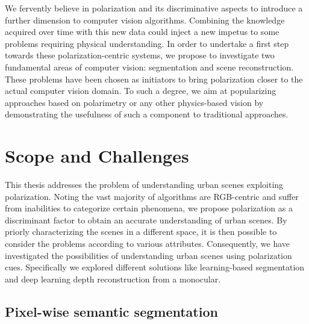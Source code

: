 We fervently believe in polarization and its discriminative aspects to introduce a further dimension to computer vision algorithms. Combining the knowledge acquired over time with this new data could inject a new impetus to some problems requiring physical understanding. In order to undertake a first step towards these polarization-centric systems, we propose to investigate two fundamental areas of computer vision: segmentation and scene reconstruction. These problems have been chosen as initiators to bring polarization closer to the actual computer vision domain. To such a degree, we aim at popularizing approaches based on polarimetry or any other physics-based vision by demonstrating the usefulness of such a component to traditional approaches.



\section{Scope and Challenges}
This thesis addresses the problem of understanding urban scenes exploiting polarization. Noting the vast majority of algorithms are RGB-centric and suffer from inabilities to categorize certain phenomena, we propose polarization as a discriminant factor to obtain an accurate understanding of urban scenes. By priorly characterizing the scenes in a different space, it is then possible to consider the problems according to various attributes. Consequently, we have investigated the possibilities of understanding urban scenes using polarization cues. Specifically we explored different solutions like learning-based segmentation and deep learning depth reconstruction from a monocular.

\subsection{Pixel-wise semantic segmentation}


